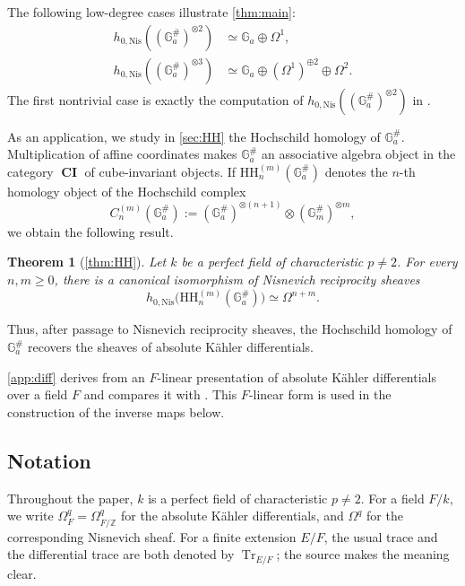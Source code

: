 \documentclass[a4paper,12pt,reqno]{amsart}
\numberwithin{equation}{section}
\newtheorem{thm}{Theorem}[section]
\theoremstyle{definition}
\newcommand{\Z}{\mathbb{Z}}
\DeclareMathOperator{\Tr}{Tr}
\newcommand{\Ga}{\mathbb{G}_{a}}
\newcommand{\CI}{\operatorname{\mathbf{CI}}}
\newcommand{\GaSharp}{\mathbb{G}_{a}^{\#}}
\newcommand{\GmSharp}{\mathbb G_m^{\#}}
\newcommand{\Nis}{\mathrm{Nis}}
\begin{document}
The following low-degree cases illustrate \autoref{thm:main}:
\begin{align*}
 h_{0,\Nis}((\GaSharp)^{\otimes 2})&\simeq \Ga\oplus\Omega^1,\\
 h_{0,\Nis}((\GaSharp)^{\otimes 3})&\simeq
 \Ga\oplus(\Omega^1)^{\oplus 2}\oplus\Omega^2.
\end{align*}
The first nontrivial case is exactly the computation of $h_{0,\Nis}((\GaSharp)^{\otimes 2})$ in
\cite[Theorem~5.14]{RSY22}.

As an application, we study in \autoref{sec:HH} the Hochschild homology of
$\GaSharp$.  Multiplication of affine coordinates makes $\GaSharp$ an
associative algebra object in the category $\CI$ of cube-invariant objects. 
If $\mathrm{HH}_n^{(m)}(\GaSharp)$ denotes
the $n$-th homology object of the Hochschild complex
\[
C_n^{(m)}(\GaSharp) :=
 (\GaSharp)^{\otimes (n+1)}\otimes(\GmSharp)^{\otimes m}, 
\]
we obtain the following result.

\begin{thm}[{\autoref{thm:HH}}]\label{thm:HHin}
Let $k$ be a perfect field of characteristic $p\neq 2$. 
For every $n,m\geq0$, there is a canonical isomorphism of Nisnevich
reciprocity sheaves
\begin{equation}\label{eq:HH-intro}
 h_{0,\Nis}\bigl(\mathrm{HH}_n^{(m)}(\GaSharp)\bigr)\simeq\Omega^{n+m}.
\end{equation}
\end{thm}

Thus, after passage to Nisnevich reciprocity sheaves, the Hochschild
homology of $\GaSharp$ recovers the sheaves of absolute K\"ahler
differentials.  


\autoref{app:diff} derives from \cite[Lemma~4.2]{BK86} an
$F$-linear presentation of absolute K\"ahler differentials over a field
$F$ and compares it with \cite[Lemma~4.1]{BE03}.  This $F$-linear form is
used in the construction of the inverse maps below.



\subsection*{Notation}
Throughout the paper, $k$ is a perfect field of characteristic $p \neq 2$.  For a
field $F/k$, we write $\Omega_F^q=\Omega^q_{F/\Z}$ for the absolute K\"ahler
differentials, and $\Omega^q$ for the corresponding Nisnevich sheaf.  For a
finite extension $E/F$, the usual trace and the differential trace are both
denoted by $\Tr_{E/F}$; the source makes the meaning clear.
\end{document}
